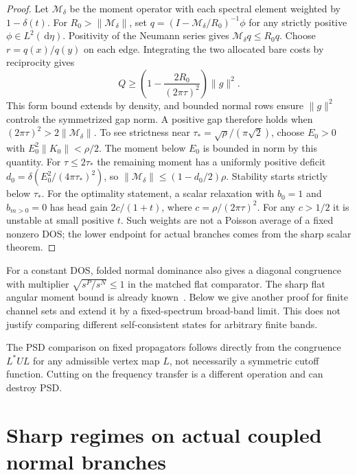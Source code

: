 \documentclass[11pt]{article}
\newcommand{\dd}{\,\mathrm{d}}
\begin{document}
\begin{proof}
Let $\mathcal M_\delta$ be the moment operator with each spectral element weighted by $1-\delta(t)$. For $R_0>\|\mathcal M_\delta\|$, set $q=(I-\mathcal M_\delta/R_0)^{-1}\phi$ for any strictly positive $\phi\in L^2(\dd\eta)$. Positivity of the Neumann series gives $\mathcal M_\delta q\le R_0 q$. Choose $r=q(x)/q(y)$ on each edge. Integrating the two allocated bare costs by reciprocity gives
\[
 Q\ge \left(1-\frac{2R_0}{(2\pi\tau)^2}\right)\|g\|^2 .
\]
This form bound extends by density, and bounded normal rows ensure $\|g\|^2$ controls the symmetrized gap norm. A positive gap therefore holds when $(2\pi\tau)^2>2\|\mathcal M_\delta\|$. To see strictness near $\tau_*=\sqrt\rho/(\pi\sqrt2)$, choose $E_0>0$ with $E_0^2\|K_0\|<\rho/2$. The moment below $E_0$ is bounded in norm by this quantity. For $\tau\le 2\tau_*$ the remaining moment has a uniformly positive deficit $d_0=\delta(E_0^2/(4\pi\tau_*)^2)$, so $\|\mathcal M_\delta\|\le(1-d_0/2)\rho$. Stability starts strictly below $\tau_*$. For the optimality statement, a scalar relaxation with $b_0=1$ and $b_{m>0}=0$ has head gain $2c/(1+t)$, where $c=\rho/(2\pi\tau)^2$. For any $c>1/2$ it is unstable at small positive $t$. Such weights are not a Poisson average of a fixed nonzero DOS; the lower endpoint for actual branches comes from the sharp scalar theorem.
\end{proof}

For a constant DOS, folded normal dominance also gives a diagonal congruence with multiplier $\sqrt{s^P/s^N}\le1$ in the matched flat comparator. The sharp flat angular moment bound is already known~\cite[Theorems 7--9]{gsi}. Below we give another proof for finite channel sets and extend it by a fixed-spectrum broad-band limit. This does not justify comparing different self-consistent states for arbitrary finite bands.

The PSD comparison on fixed propagators follows directly from the congruence $L^*UL$ for any admissible vertex map $L$, not necessarily a symmetric cutoff function. Cutting on the frequency transfer is a different operation and can destroy PSD.

\section{Sharp regimes on actual coupled normal branches}
\end{document}
